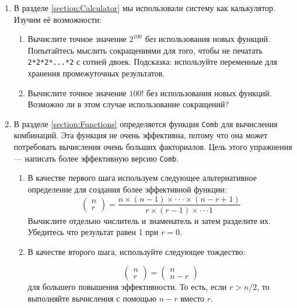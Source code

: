 \begin{enumerate}
\item{В разделе \ref{section:Calculator} мы использовали систему как калькулятор. Изучим её возможности:
  \begin{enumerate}
  \item{Вычислите точное значение $2^{100}$ \emph{без} использования новых функций. Попытайтесь мыслить сокращениями для того, чтобы не печатать \lstinline|2*2*2*...*2| с сотней двоек. Подсказка: используйте переменные для хранения промежуточных результатов.}
  \item{Вычислите точное значение $100!$ без использования новых функций. Возможно ли в этом случае использование сокращений?}
  \end{enumerate}
}

\item{В разделе \ref{section:Functions} определяется функция \lstinline|Comb| для вычисления комбинаций. Эта функция не очень эффективна, потому что она может потребовать вычисления очень больших факториалов. Цель этого упражнения --- написать более эффективную версию \lstinline|Comb|.

  \begin{enumerate}

  \item{В качестве первого шага используем следующее альтернативное определение для создания более эффективной функции:
    $$
    \begin{pmatrix}
      n \\
      r
    \end{pmatrix}
    =
    \frac{n \times (n - 1) \times \cdot \cdot \cdot \times (n - r +1)}{r \times (r - 1) \times \cdot \cdot \cdot 1}
    $$
    Вычислите отдельно числитель и знаменатель и затем разделите их. Убедитесь что результат равен 1 при $r = 0$.
  }

  \item{В качестве второго шага, используйте следующее тождество:
    
    $$
    \begin{pmatrix}
      n \\
      r
    \end{pmatrix}
    =
    \begin{pmatrix}
      n \\
      n - r
    \end{pmatrix}
    $$
для большего повышения эффективности. То есть, если $r > n/2$, то выполняйте вычисления с помощью $n - r$ вместо $r$.
  }
  \end{enumerate}

}
\end{enumerate}
